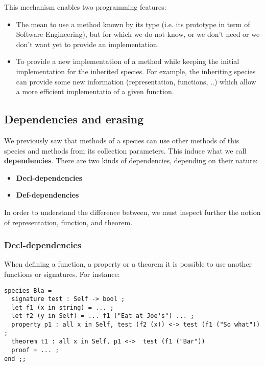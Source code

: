 \smallskip
This mechanism enables two programming features:
\begin{itemize}
  \item The mean to use a method known by its type (i.e. its prototype
    in term of Software Engineering), but for which we do not know, or
    we don't need or we don't want yet to provide an implementation.

  \item To provide a new implementation of a method while  keeping the
    initial implementation for the inherited species. For example, the
    inheriting species can provide some new information
    (representation, functions, ..) which allow a more efficient
    implementatio of a given function.
\end{itemize}



\subsection{Dependencies and erasing}\label{dependencies}
We previously saw that methods of a species can use other methods of
this species and methods from its collection parameters. This induce
what we call {\bf dependencies}. There are two kinds
of dependencies, depending on their nature:
\begin{itemize}
  \item {\bf Decl-dependencies}
  \item {\bf Def-dependencies}
\end{itemize}
In order to understand the difference between, we must inspect further
the notion of representation, function, and theorem.



\subsubsection{Decl-dependencies}
When defining a function, a property or a theorem it is possible to
use another functions or signatures. For instance:
{\scriptsize
\begin{lstlisting}
species Bla =
  signature test : Self -> bool ;
  let f1 (x in string) = ... ;
  let f2 (y in Self) = ... f1 ("Eat at Joe's") ... ;
  property p1 : all x in Self, test (f2 (x)) <-> test (f1 ("So what")) ;
  theorem t1 : all x in Self, p1 <->  test (f1 ("Bar"))
  proof = ... ;
end ;;
\end{lstlisting}
}

